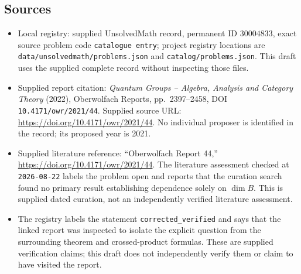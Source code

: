 \documentclass[11pt]{article}
\begin{document}
\subsection{Sources}
\begin{itemize}
\item Local registry: supplied UnsolvedMath record, permanent ID \(30004833\), exact source problem code \texttt{catalogue entry}; project registry locations are \texttt{data/unsolvedmath/problems.json} and \texttt{catalog/problems.json}. This draft uses the supplied complete record without inspecting those files.
\item Supplied report citation: \emph{Quantum Groups -- Algebra, Analysis and Category Theory} (2022), Oberwolfach Reports, pp.\ 2397--2458, DOI \texttt{10.4171/owr/2021/44}. Supplied source URL: \url{https://doi.org/10.4171/owr/2021/44}. No individual proposer is identified in the record; its proposed year is 2021.
\item Supplied literature reference: ``Oberwolfach Report 44,'' \url{https://doi.org/10.4171/owr/2021/44}. The literature assessment checked at \texttt{2026-08-22} labels the problem open and reports that the curation search found no primary result establishing dependence solely on \(\dim B\). This is supplied dated curation, not an independently verified literature assessment.
\item The registry labels the statement \texttt{corrected\_verified} and says that the linked report was inspected to isolate the explicit question from the surrounding theorem and crossed-product formulas. These are supplied verification claims; this draft does not independently verify them or claim to have visited the report.
\end{itemize}
\end{document}
